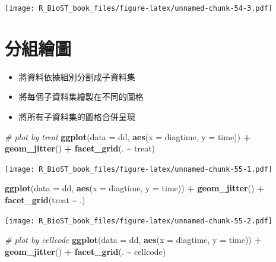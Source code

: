 \documentclass[
]{book}
\newenvironment{Shaded}{\begin{snugshade}}{\end{snugshade}}
\newcommand{\CommentTok}[1]{\textcolor[rgb]{0.56,0.35,0.01}{\textit{#1}}}
\newcommand{\DataTypeTok}[1]{\textcolor[rgb]{0.13,0.29,0.53}{#1}}
\newcommand{\KeywordTok}[1]{\textcolor[rgb]{0.13,0.29,0.53}{\textbf{#1}}}
\newcommand{\NormalTok}[1]{#1}
\newcommand{\OperatorTok}[1]{\textcolor[rgb]{0.81,0.36,0.00}{\textbf{#1}}}
\newcommand{\StringTok}[1]{\textcolor[rgb]{0.31,0.60,0.02}{#1}}
\providecommand{\tightlist}{%
  \setlength{\itemsep}{0pt}\setlength{\parskip}{0pt}}
\begin{document}
\texttt{[image: R\_BioST\_book\_files/figure-latex/unnamed-chunk-54-3.pdf]}

\hypertarget{ux5206ux7d44ux7e6aux5716}{%
\section{分組繪圖}\label{ux5206ux7d44ux7e6aux5716}}

\begin{itemize}
\tightlist
\item
  將資料依據組別分割成子資料集
\item
  將每個子資料集繪製在不同的圖格
\item
  將所有子資料集的圖格合併呈現
\end{itemize}

\begin{Shaded}
\begin{Highlighting}[]
\CommentTok{\# plot by treat}
\KeywordTok{ggplot}\NormalTok{(}\DataTypeTok{data =}\NormalTok{ dd, }\KeywordTok{aes}\NormalTok{(}\DataTypeTok{x =}\NormalTok{ diagtime, }\DataTypeTok{y =}\NormalTok{ time)) }\OperatorTok{+}\StringTok{ }\KeywordTok{geom\_jitter}\NormalTok{() }\OperatorTok{+}\StringTok{ }
\StringTok{  }\KeywordTok{facet\_grid}\NormalTok{(. }\OperatorTok{\textasciitilde{}}\StringTok{ }\NormalTok{treat)}
\end{Highlighting}
\end{Shaded}

\texttt{[image: R\_BioST\_book\_files/figure-latex/unnamed-chunk-55-1.pdf]}

\begin{Shaded}
\begin{Highlighting}[]
\KeywordTok{ggplot}\NormalTok{(}\DataTypeTok{data =}\NormalTok{ dd, }\KeywordTok{aes}\NormalTok{(}\DataTypeTok{x =}\NormalTok{ diagtime, }\DataTypeTok{y =}\NormalTok{ time)) }\OperatorTok{+}\StringTok{ }\KeywordTok{geom\_jitter}\NormalTok{() }\OperatorTok{+}\StringTok{ }
\StringTok{  }\KeywordTok{facet\_grid}\NormalTok{(treat }\OperatorTok{\textasciitilde{}}\StringTok{ }\NormalTok{.)}
\end{Highlighting}
\end{Shaded}

\texttt{[image: R\_BioST\_book\_files/figure-latex/unnamed-chunk-55-2.pdf]}

\begin{Shaded}
\begin{Highlighting}[]
\CommentTok{\# plot by cellcode}
\KeywordTok{ggplot}\NormalTok{(}\DataTypeTok{data =}\NormalTok{ dd, }\KeywordTok{aes}\NormalTok{(}\DataTypeTok{x =}\NormalTok{ diagtime, }\DataTypeTok{y =}\NormalTok{ time)) }\OperatorTok{+}\StringTok{ }\KeywordTok{geom\_jitter}\NormalTok{() }\OperatorTok{+}\StringTok{ }
\StringTok{  }\KeywordTok{facet\_grid}\NormalTok{(. }\OperatorTok{\textasciitilde{}}\StringTok{ }\NormalTok{cellcode)}
\end{Highlighting}
\end{Shaded}
\end{document}
